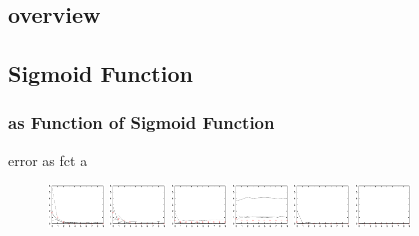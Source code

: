 \documentclass{beamer}
\begin{document}
\subsection{overview}
\begin{frame}
    \tableofcontents
\end{frame}
\subsection{Sigmoid Function}
\begin{frame}
\frametitle{as Function of Sigmoid Function}
error as fct a
	\begin{figure}
		\centering
		\includegraphics[width=1.5cm]{fig/err/ea1.eps}
		\includegraphics[width=1.5cm]{fig/err/ea2.eps}
		\includegraphics[width=1.5cm]{fig/err/ea3.eps}
		\hspacs
		\includegraphics[width=1.5cm]{fig/err/ea4.eps}
		\includegraphics[width=1.5cm]{fig/err/ea5.eps}
		\includegraphics[width=1.5cm]{fig/err/ea6.eps}
	\end{figure}
\end{frame}
\end{document}
